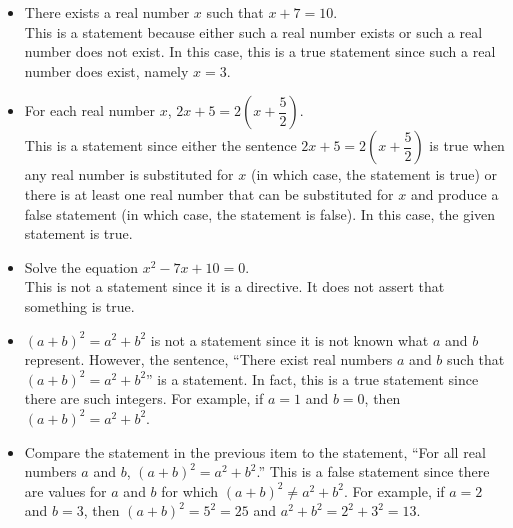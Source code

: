 \begin{itemize}
  \item There exists a real number $x$ such that $x+7 = 10$. \\
This is a statement because either such a real number exists or such a real number does not exist.  In this case, this is a true statement since such a real number does exist, namely $x = 3$.
  \item For each real number $x$, $2x + 5 = 2\left(x + \dfrac{5}{2} \right)$.\\
This is a statement since either the sentence $2x + 5 = 2\left(x + \dfrac{5}{2} \right)$ is true when any real number is substituted for $x$ (in which case, the statement is true) or there is at least one real number that can be substituted for $x$ and produce a false statement (in which case, the statement is false).  In this case, the given statement is true.
  \item Solve the equation $x^2 - 7x + 10 = 0$. \\
This is not a statement since it is a directive.  It does not assert that something is true.
  \item $(a + b)^2 = a^2 + b^2$ is not a statement since it is not known what $a$ and $b$ represent.  However, the sentence, ``There exist real numbers $a$ and $b$ such that $(a + b)^2 = a^2 + b^2$'' is a statement.  In fact, this is a true statement since there are such integers.  For example, if $a = 1$ and $b = 0$, then 
$(a + b)^2 = a^2 + b^2$.
  \item Compare the statement in the previous item to the statement, ``For all real numbers $a$ and $b$, 
$(a + b)^2 = a^2 + b^2$.''  This is a false statement since there are values for $a$ and $b$ for which 
$(a + b)^2 \ne a^2 + b^2$.  For example, if $a = 2$ and $b = 3$, then $(a + b)^2 = 5^2 = 25$ and 
$a^2 + b^2 = 2^2 + 3^2 = 13$.
\end{itemize}


